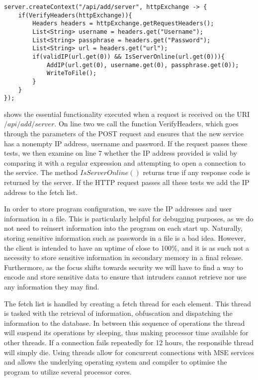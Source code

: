 \begin{lstlisting}[caption={Adding a server to the fetch list},label={lst:add_server},language=inc_Java, mathescape]
server.createContext("/api/add/server", httpExchange -> {
    if(VerifyHeaders(httpExchange)){
        Headers headers = httpExchange.getRequestHeaders();
        List<String> username = headers.get("Username");
        List<String> passphrase = headers.get("Password");
        List<String> url = headers.get("url");
        if(validIP(url.get(0)) && IsServerOnline(url.get(0))){
            AddIP(url.get(0), username.get(0), passphrase.get(0));
            WriteToFile();
        }
    }
});
\end{lstlisting}
 shows the essential functionality executed when a request is received on the URI $/api/add/server$. On line two we call the function VerifyHeaders, which goes through the parameters of the POST request and ensures that the new service has a nonempty IP address, username and password. If the request passes these tests, we then examine on line 7 whether the IP address provided is valid by comparing it with a regular expression and attempting to open a connection to the service. The method $IsServerOnline()$ returns true if any response code is returned by the server. If the HTTP request passes all these tests we add the IP address to the fetch list.

In order to store program configuration, we save the IP addresses and user information in a file. This is particularly helpful for debugging purposes, as we do not need to reinsert information into the program on each start up. Naturally, storing sensitive information such as passwords in a file is a bad idea. However, the client is intended to have an uptime of close to 100\%, and it is as such not a necessity to store sensitive information in secondary memory in a final release. Furthermore, as the focus shifts towards security we will have to find a way to encode and store sensitive data to ensure that intruders cannot retrieve nor use any information they may find.

The fetch list is handled by creating a fetch thread for each element. This thread is tasked with the retrieval of information, obfuscation and dispatching the information to the database. In between this sequence of operations the thread will suspend its operations by sleeping, thus making processor time available for other threads. If a connection fails repeatedly for 12 hours, the responsible thread will simply die. Using threads allow for concurrent connections with MSE services and allows the underlying operating system and compiler to optimise the program to utilize several processor cores.